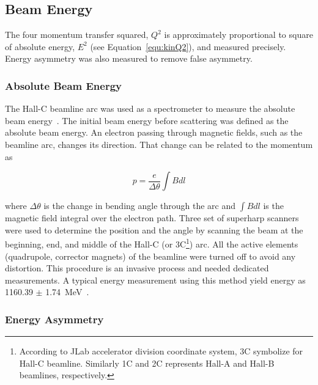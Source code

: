 \subsection{Beam Energy}%
\label{Beam Energy}

The four momentum transfer squared, $Q^{2}$ is approximately proportional to square of absolute energy, $E^{2}$ (see Equation~\ref{equ:kinQ2}), and measured precisely. Energy asymmetry was also measured to remove false asymmetry. 

\subsubsection{Absolute Beam Energy}%
\label{Absolute Beam Energy}

The Hall-C beamline arc was used as a spectrometer to measure the absolute beam energy~\cite{Yan:1993fd}. The initial beam energy before scattering was defined as the absolute beam energy. 
An electron passing through magnetic fields, such as the beamline arc, changes its direction. That change can be related to the momentum as

\begin{equation} \label{equ:energy1}
p = \frac{e}{\Delta\theta} \int Bdl
\end{equation}

\noindent
where $\Delta\theta$ is the change in bending angle through the arc and $\int Bdl$ is the magnetic field integral over the electron path. Three set of superharp scanners~\cite{Yan1995261} were used to determine the position and the angle by scanning the beam at the beginning, end, and middle of the Hall-C (or 3C\footnote{According to JLab accelerator division coordinate system, 3C symbolize for Hall-C beamline. Similarly 1C and 2C represents Hall-A and Hall-B beamlines, respectively.}) arc. All the active elements (quadrupole, corrector magnets) of the beamline were turned off to avoid any distortion. This procedure is an invasive process and needed dedicated measurements. A typical energy measurement using this method yield energy as 1160.39 $\pm$ 1.74~MeV~\cite{kmyers_qweak}. 


\subsubsection{Energy Asymmetry}%
\label{Energy Asymmetry}

